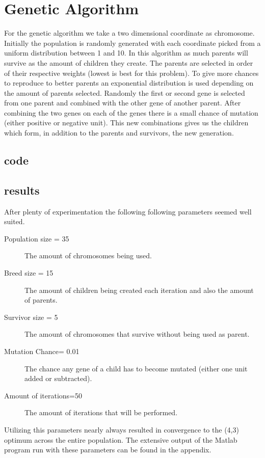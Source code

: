 \documentclass[11pt,a4paper,oneside]{article}
\begin{document}
\section{Genetic Algorithm}
For the genetic algorithm we take a two dimensional coordinate as chromosome.
Initially the population is randomly generated with each coordinate picked from a uniform distribution between 1 and 10. 
In this algorithm as much parents will survive as the amount of children they create.
The parents are selected in order of their respective weights (lowest is best for this problem).
To give more chances to reproduce to better parents an exponential distribution is used depending on the amount of parents selected.
Randomly the first or second gene is selected from one parent and combined with the other gene of another parent.
After combining the two genes on each of the genes there is a small chance of mutation (either positive or negative unit).
This new combinations gives us the children which form, in addition to the parents and survivors, the new generation. 
\subsection{code}

\subsection{results}
After plenty of experimentation the following following parameters seemed well suited.
\begin{description}
		\item[Population size = 35] The amount of chromosomes being used.
		\item[Breed size = 15] The amount of children being created each iteration and also the amount of parents.
		\item[Survivor size = 5] The amount of chromosomes that survive without being used as parent.
		\item[Mutation Chance= 0.01] The chance any gene of a child has to become mutated (either one unit added or subtracted).
		\item[Amount of iterations=50] The amount of iterations that will be performed.
\end{description}

Utilizing this parameters nearly always resulted in convergence to the (4,3) optimum across the entire population.
The extensive output of the Matlab program run with these parameters can be found in the appendix. 
\end{document}
